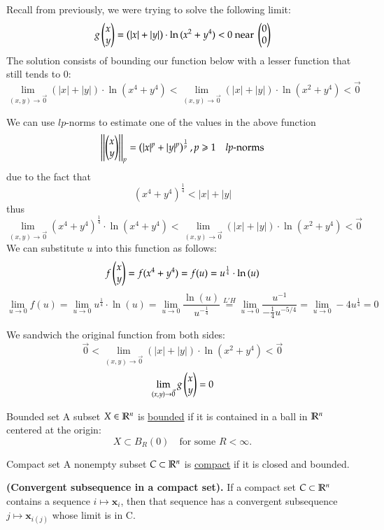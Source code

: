 
Recall from previously, we were trying to solve the following limit:
\[g\begin{pmatrix} x \\ y \end{pmatrix}= \left( |x|+|y| \right)\cdot \ln{(x^2+y^4)}<0 \text{ near }\begin{pmatrix} 0 \\ 0 \end{pmatrix}\]
The solution consists of bounding our function below with a lesser function that still tends to 0: 
\[\lim_{(x,y)\to \vec{0}}(|x|+|y|)\cdot \ln{(x^4+y^4)}<\lim_{(x,y)\to \vec{0}}(|x|+|y|)\cdot \ln{(x^2+y^4)}<\vec{0}\]

We can use $lp$-norms to estimate one of the values in the above function
\[\left|\left| \begin{pmatrix} x \\ y \end{pmatrix}\right|\right|_p=\left(|x|^p + |y|^p\right)^{\frac{1}{p}}, p\geqslant 1\quad lp\text{-norms}\]
due to the fact that
\[(x^4+y^4)^{\frac{1}{4}} < |x| + |y|\]
thus
\[\lim_{(x,y)\to \vec{0}}(x^4+y^4)^{\frac{1}{4}}\cdot \ln{(x^4+y^4)}<\lim_{(x,y)\to \vec{0}}(|x|+|y|)\cdot \ln{(x^2+y^4)}<\vec{0}\]
We can substitute $u$ into this function as follows: 
\[f\begin{pmatrix} x \\ y \end{pmatrix}=f(x^4+y^4)=f(u)=u^{\frac{1}{4}}\cdot \ln{(u)}\]
\[\lim_{u\rightarrow 0} f(u)=\lim_{u\rightarrow 0} u^{\frac{1}{4}}\cdot \ln{(u)}=\lim_{u\rightarrow 0} \frac{\ln{(u)}}{u^{-\frac{1}{4}}}\stackrel{L'H}{=}\lim_{u\rightarrow 0} \frac{u^{-1}}{-\frac{1}{4}u^{-5/4}}=\lim_{u\rightarrow 0}-4u^{\frac{1}{4}}=0\]

We sandwich the original function from both sides: 
\[\vec{0}<\lim_{(x,y)\to \vec{0}}(|x|+|y|)\cdot \ln{(x^2+y^4)}<\vec{0}\]
\[\lim_{(x,y)\to \vec{0}} g\begin{pmatrix} x \\ y \end{pmatrix} = 0\]

\newpage

\begin{defn}{Bounded set}
A subset $X\in \mathbb{R}^n$ is \ul{bounded} if it is contained in a ball in $\mathbb{R}^n$ centered at the origin:
  \[X\subset B_R(0)\quad \text{for some }R<\infty.\]
\end{defn}

\begin{defn}{Compact set}
A nonempty subset $C\subset \mathbb{R}^n$ is \ul{compact} if it is closed and bounded.
\end{defn}

\begin{theorem}
  \textbf{(Convergent subsequence in a compact set).} If a compact set $C\subset \mathbb{R}^n$ contains a sequence $i\mapsto \bm{x}_i$, then that sequence has a convergent subsequence $j\mapsto \bm{x}_{i(j)}$ whose limit is in C.
\end{theorem}
